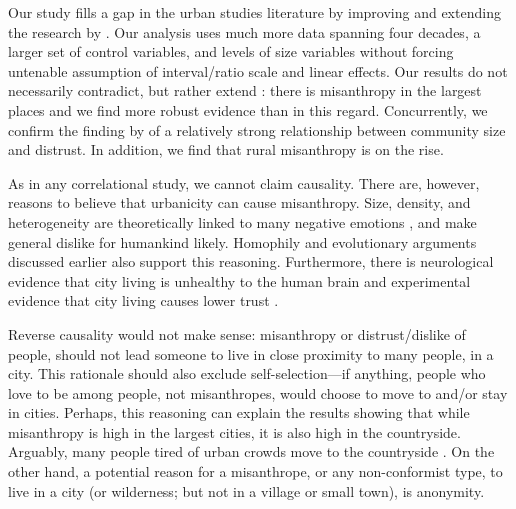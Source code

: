\documentclass[11pt, letterpaper]{article}
\begin{document}
\begin{spacing}{1.4}
Our study fills a gap in the urban studies literature by improving and extending the research by \citet{wilson85}. Our analysis uses much more data spanning four decades, a larger set of control variables, and levels of size variables without
forcing untenable assumption of interval/ratio scale and linear effects. Our
results do not necessarily contradict, but rather extend \citet{wilson85}: there
is misanthropy in the largest places %
and we find more robust evidence than \citet{wilson85} in this regard. Concurrently, we confirm the finding by \citet{fischer81} of a relatively strong relationship between community size and distrust. In addition, we find that rural misanthropy is on the rise.


As in any correlational study, we cannot claim causality. There are, however,
reasons to believe that urbanicity can cause misanthropy. Size, density, and
heterogeneity are theoretically linked to many negative emotions
\citep{wirth38}, and make general dislike for humankind likely. Homophily and
evolutionary arguments discussed earlier also support this reasoning. {Furthermore, there is neurological evidence that city living is unhealthy to the human brain \citep{lederbogen11} and experimental evidence that city living causes lower trust \citep{milgram70}.}

Reverse causality would not make sense: misanthropy or distrust/dislike of people, should
not lead someone to live in close proximity to many people, in a city. This rationale should also exclude self-selection---if anything, people who
 love to be among  people, not misanthropes, would choose to move to and/or stay in cities. Perhaps, this reasoning can explain the results showing that while misanthropy is high in the largest
cities, it is also high in the countryside. Arguably, many people tired of urban crowds move to the countryside \citep[e.g.,][]{deweyWP17nov23}.
%
On the other hand, a potential reason for a misanthrope, or any  non-conformist type, to live in a city (or wilderness; but not in a village or small town), is anonymity.


\end{spacing}
\end{document}
